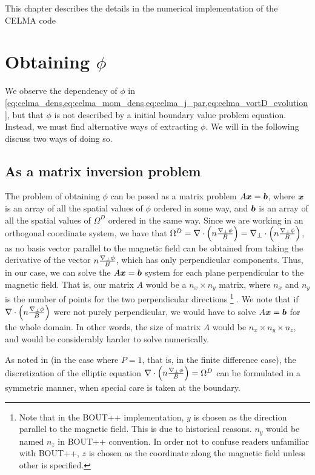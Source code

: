 This chapter describes the details in the numerical implementation of the CELMA code

\section{Obtaining \texorpdfstring{$\phi$}{the potential}}
%
We observe the dependency of $\phi$ in \cref{eq:celma_dens,eq:celma_mom_dens,eq:celma_j_par,eq:celma_vortD_evolution}, but that $\phi$ is not described by a initial boundary value problem equation.
Instead, we must find alternative ways of extracting $\phi$.
We will in the following discuss two ways of doing so.

\subsection{As a matrix inversion problem}
%
The problem of obtaining $\phi$ can be posed as a matrix problem $A\boldsymbol{x}=\boldsymbol{b}$, where $\boldsymbol{x}$ is an array of all the spatial values of $\phi$ ordered in some way, and $\boldsymbol{b}$ is an array of all the spatial values of $\Omega^D$ ordered in the same way.
Since we are working in an orthogonal coordinate system, we have that $\Omega^D = \nabla\cdot\left(n\frac{\nabla_\perp\phi}{B}\right) = \nabla_\perp\cdot\left(n\frac{\nabla_\perp\phi}{B}\right)$, as no basis vector parallel to the magnetic field can be obtained from taking the derivative of the vector $n\frac{\nabla_\perp\phi}{B}$, which has only perpendicular components.
Thus, in our case, we can solve the $A\boldsymbol{x}=\boldsymbol{b}$ system for each plane perpendicular to the magnetic field.
That is, our matrix $A$ would be a $n_x \times n_y$ matrix, where $n_x$ and $n_y$ is the number of points for the two perpendicular directions
%
\footnote{
Note that in the BOUT++ implementation, $y$ is chosen as the direction parallel to the magnetic field.
This is due to historical reasons.
$n_y$ would be named $n_z$ in BOUT++ convention.
In order not to confuse readers unfamiliar with BOUT++, $z$ is chosen as the coordinate along the magnetic field unless other is specified.
}%
%
.
We note that if $\nabla\cdot\left(n\frac{\nabla_\perp\phi}{B}\right)$ were not purely perpendicular, we would have to solve $A\boldsymbol{x}=\boldsymbol{b}$ for the whole domain.
In other words, the size of matrix $A$ would be $n_x \times n_y \times n_z$, and would be considerably harder to solve numerically.

As noted in \cite{Wiesenberger2014Phd} (in the case where $P=1$, that is, in the finite difference case), the discretization of the elliptic equation $\nabla\cdot\left(n\frac{\nabla_\perp\phi}{B}\right)=\Omega^D$ can be formulated in a symmetric manner, when special care is taken at the boundary.

